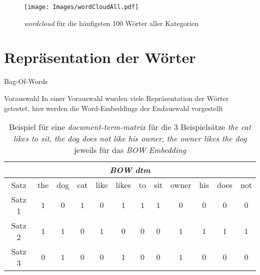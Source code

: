 \documentclass[8pt, xcolor = dvipsnames]{beamer}
\begin{document}
\begin{frame}
\begin{figure}[ht]
    \centering
\texttt{[image: Images/wordCloudAll.pdf]} 
\caption{\textit{wordcloud} für die häufigsten 100 Wörter aller Kategorien}
\label{abb:WordcloudAll}
\end{figure}
\end{frame}


\section{Repräsentation der Wörter}



\begin{frame}{Bag-Of-Words}

\begin{block}{Vorauswahl}
In einer Vorauswahl wurden viele Repräsentation der Wörter getestet, hier werden die Word-Embeddings der Endauswahl vorgestellt
\end{block}{}

\begin{table}[ht]
\begin{center}

\begin{tabular}{|c||ccccccccccc|}
\hline
\multicolumn{12}{|c|}{\textit{BOW} \textit{dtm}} \\
\hline 
   Satz   & the & dog & cat & like & likes &  to & sit  & owner & his &  does & not \\
      \hline
Satz 1 & $1$ & $0$ & $1$ & $0$ & $1$ & $1$ & $1$ & $0$ & $0$ &  $0$ & $0$ \\
Satz 2 & $1$ & $1$ & $0$ & $1$ & $0$ & $0$ & $0$ & $1$ & $1$ &  $1$ & $1$ \\
Satz 3 & $0$ & $1$ & $0$ & $0$ & $1$ & $0$ & $0$ & $1$ & $0$ &  $0$ & $0$ \\

\hline

\end{tabular}
\end{center}{}
\caption{Beispiel für eine \textit{document-term-matrix} für die $3$ Beispielsätze \textit{the cat likes to sit}, \textit{the dog does not like his owner}, \textit{the owner likes the dog} jeweils für das \textit{BOW Embedding}}  
\label{tab:BOWExample}

\end{table}
\end{frame}{}
\end{document}
